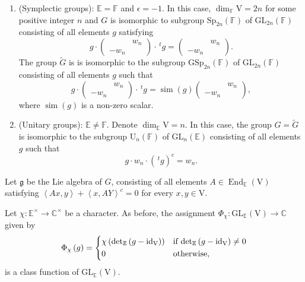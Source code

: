 \documentclass[12pt, reqno]{amsart}
\theoremstyle{definition}
\theoremstyle{definition}
\theoremstyle{definition}
\newcommand{\cComplex}{\mathbb{C}}
\newcommand{\multiplicativegroup}[1]{#1^{\times}}
\newcommand{\detQuadratic}{{\det}_{\quadraticExtension}}
\newcommand{\EndomorphismRing}{\operatorname{End}}
\newcommand{\idmap}{\mathrm{id}}
\newcommand{\hermitianSpace}{\mathrm{V}}
\newcommand{\similitudeCharacter}{\operatorname{sim}}
\newcommand{\innerproduct}[2]{\left\langle #1,#2\right\rangle}
\newcommand{\transpose}[1]{\, {}^{t}#1}
\newcommand{\involution}[1]{#1^{c}}
\newcommand{\GL}{\mathrm{GL}}
\newcommand{\Sp}{\mathrm{Sp}}
\newcommand{\GSp}{\mathrm{GSp}}
\newcommand{\UnitaryGroup}{\mathrm{U}}
\newcommand{\GroupExtension}[1]{\widetilde{#1}}
\newcommand{\finiteField}{\mathbb{F}}
\newcommand{\quadraticExtension}{\mathbb{E}}
\newcommand{\lieAlgebra}{\mathfrak{g}}
\begin{document}
\begin{enumerate}
	\item (Symplectic groups): $\quadraticExtension = \finiteField$ and $\epsilon = -1$. In this case, $\dim_{\finiteField} \hermitianSpace = 2n$ for some positive integer $n$ and $G$ is isomorphic to subgroup $\Sp_{2n}\left(\finiteField\right)$ of $\GL_{2n}\left(\finiteField\right)$ consisting of all elements $g$ satisfying $$g \cdot \begin{pmatrix}
		& w_n\\
		-w_n
	\end{pmatrix} \cdot \transpose{g} = \begin{pmatrix}
	& w_n\\
	-w_n
	\end{pmatrix}.$$ The group $\GroupExtension{G}$ is is isomorphic to the subgroup $\GSp_{2n}\left(\finiteField\right)$ of $\GL_{2n}\left(\finiteField\right)$ consisting of all elements $g$ such that $$g \cdot \begin{pmatrix}
	& w_n\\
	-w_n
	\end{pmatrix} \cdot \transpose{g} = \similitudeCharacter\left(g\right) \begin{pmatrix}
	& w_n\\
	-w_n
	\end{pmatrix},$$
	where $\similitudeCharacter\left(g\right)$ is a non-zero scalar.
	\item (Unitary groups): $\quadraticExtension \ne \finiteField$. Denote $\dim_{\quadraticExtension} \hermitianSpace = n$. In this case, the group $G = \GroupExtension{G}$ is isomorphic to the subgroup $\UnitaryGroup_n\left(\finiteField\right)$ of $\GL_{n}\left(\quadraticExtension\right)$ consisting of all elements $g$ such that $$g \cdot w_n \cdot \involution{\left(\transpose{g}\right)} = w_n.$$
\end{enumerate}

Let $\lieAlgebra$ be the Lie algebra of $G$, consisting of all elements $A \in \EndomorphismRing_{\quadraticExtension}\left(\hermitianSpace\right)$ satisfying $\innerproduct{Ax}{y} + \involution{\innerproduct{x}{AY}} = 0$ for every $x, y \in \hermitianSpace$.



Let $\chi \colon \multiplicativegroup{\quadraticExtension} \to \multiplicativegroup{\cComplex}$ be a character. As before, the assignment $\Phi_{\chi} \colon \GL_{\quadraticExtension}\left(\hermitianSpace\right) \to \cComplex$ given by $$\Phi_{\chi}\left(g\right) = \begin{dcases}
\chi\left(\detQuadratic\left(g - \idmap_{\hermitianSpace}\right)\right) & \text{if }\detQuadratic\left(g - \idmap_{\hermitianSpace}\right) \ne 0\\
0 & \text{otherwise,}
\end{dcases}$$
is a class function of $\GL_{\quadraticExtension}\left(\hermitianSpace\right)$.
\end{document}
